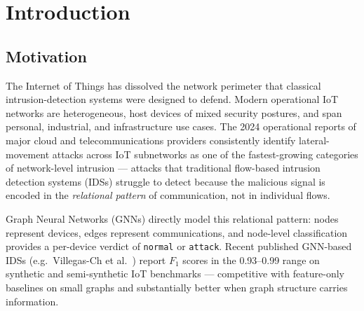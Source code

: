 \documentclass[11pt,a4paper]{report}
\theoremstyle{definition}
\theoremstyle{remark}
\begin{document}
{\setlength{\parskip}{0pt}\tableofcontents\par}
\vspace{0.5em}
\begin{minipage}[t]{0.5\textwidth}
{\setlength{\parskip}{0pt}\listoffigures}
\end{minipage}\hfill
\begin{minipage}[t]{0.45\textwidth}
{\setlength{\parskip}{0pt}\listoftables}
\end{minipage}
\vspace{0.8em}
\printglossary[type=\acronymtype, title=List of Acronyms, toctitle=List of Acronyms]
\clearpage

\chapter{Introduction}
\label{ch:intro}

\section{Motivation}

The Internet of Things has dissolved the network perimeter that classical
intrusion-detection systems were designed to defend. Modern operational
IoT networks are heterogeneous, host devices of mixed security postures,
and span personal, industrial, and infrastructure use cases. The 2024
operational reports of major cloud and telecommunications providers
consistently identify lateral-movement attacks across IoT subnetworks as
one of the fastest-growing categories of network-level intrusion ---
attacks that traditional flow-based intrusion detection systems (IDSs)
struggle to detect because the malicious signal is encoded in the
\emph{relational pattern} of communication, not in individual flows.

Graph Neural Networks (GNNs) directly model this relational pattern: nodes
represent devices, edges represent communications, and node-level
classification provides a per-device verdict of \texttt{normal} or
\texttt{attack}. Recent published GNN-based IDSs (e.g.\
Villegas-Ch et al.\ \cite{villegas2023gnn}) report
$F_1$ scores in the 0.93--0.99 range on synthetic and semi-synthetic IoT
benchmarks --- competitive with feature-only baselines on small graphs
and substantially better when graph structure carries information.
\end{document}
